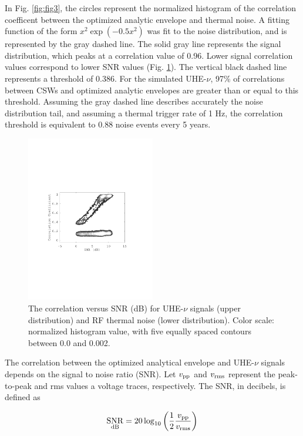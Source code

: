 \documentclass[amsmath,amssymb,aps,prd,10pt,twocolumn,showkeys]{revtex4}
\DeclareMathOperator{\snr}{SNR}
\begin{document}
\begin{itemize}
In Fig. \ref{fig:fig3}, the circles represent the normalized histogram of the correlation coefficent between the optimized analytic envelope and thermal noise.  A fitting function of the form $x^2 \exp(-0.5 x^2)$ was fit to the noise distribution, and is represented by the gray dashed line.  The solid gray line represents the signal distribution, which peaks at a correlation value of 0.96.  Lower signal correlation values correspond to lower SNR values (Fig. \ref{fig:fig4}).  The vertical black dashed line represents a threshold of 0.386.  For the simulated UHE-$\nu$, 97\% of correlations between CSWs and optimized analytic envelopes are greater than or equal to this threshold.  Assuming the gray dashed line describes accurately the noise distribution tail, and assuming a thermal trigger rate of 1 Hz, the correlation threshold is equivalent to 0.88 noise events every 5 years.

\begin{figure}
\centering
\includegraphics[width=0.5\textwidth,trim=3.25cm 8.25cm 4.5cm 9.0cm,clip=true]{Aug15_plot2.pdf}
\caption{\label{fig:fig4} The correlation versus SNR (dB) for UHE-$\nu$ signals (upper distribution) and RF thermal noise (lower distribution).  Color scale: normalized histogram value, with five equally spaced contours between 0.0 and 0.002.}
\end{figure}

The correlation between the optimized analytical envelope and UHE-$\nu$ signals depends on the signal to noise ratio (SNR).  Let $v_{\rm pp}$ and $v_{\rm rms}$ represent the peak-to-peak and rms values a voltage traces, respectively.  The SNR, in decibels, is defined as

\begin{equation}
\snr_{\rm dB} = 20\log_{10}\left(\frac{1}{2}\frac{v_{\rm pp}}{v_{\rm rms}}\right)
\end{equation}


\end{itemize}
\end{document}
